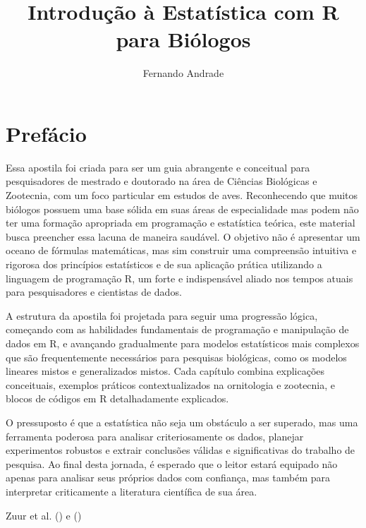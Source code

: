\documentclass[
  12pt,
  letterpaper,
  DIV=11,
  numbers=noendperiod]{scrreprt}
\title{Introdução à Estatística com R para Biólogos}
\author{Fernando Andrade}
\date{}
\renewcommand*\contentsname{Índice}
\newcommand\contentsname{Índice}
\begin{document}
\maketitle

\renewcommand*\contentsname{Sumário}
{
\hypersetup{linkcolor=}
\setcounter{tocdepth}{2}
\tableofcontents
}


\chapter*{Prefácio}\label{prefuxe1cio}


Essa apostila foi criada para ser um guia abrangente e conceitual para
pesquisadores de mestrado e doutorado na área de Ciências Biológicas e
Zootecnia, com um foco particular em estudos de aves. Reconhecendo que
muitos biólogos possuem uma base sólida em suas áreas de especialidade
mas podem não ter uma formação apropriada em programação e estatística
teórica, este material busca preencher essa lacuna de maneira saudável.
O objetivo não é apresentar um oceano de fórmulas matemáticas, mas sim
construir uma compreensão intuitiva e rigorosa dos princípios
estatísticos e de sua aplicação prática utilizando a linguagem de
programação R, um forte e indispensável aliado nos tempos atuais para
pesquisadores e cientistas de dados.

A estrutura da apostila foi projetada para seguir uma progressão lógica,
começando com as habilidades fundamentais de programação e manipulação
de dados em R, e avançando gradualmente para modelos estatísticos mais
complexos que são frequentemente necessários para pesquisas biológicas,
como os modelos lineares mistos e generalizados mistos. Cada capítulo
combina explicações conceituais, exemplos práticos contextualizados na
ornitologia e zootecnia, e blocos de códigos em R detalhadamente
explicados.

O pressuposto é que a estatística não seja um obstáculo a ser superado,
mas uma ferramenta poderosa para analisar criteriosamente os dados,
planejar experimentos robustos e extrair conclusões válidas e
significativas do trabalho de pesquisa. Ao final desta jornada, é
esperado que o leitor estará equipado não apenas para analisar seus
próprios dados com confiança, mas também para interpretar criticamente a
literatura científica de sua área.

Zuur et al. () e
()
\end{document}
